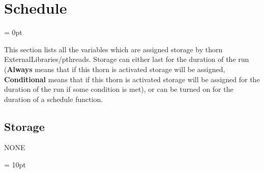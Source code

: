
\section{Schedule} 


\parskip = 0pt


\noindent This section lists all the variables which are assigned storage by thorn ExternalLibraries/pthreads.  Storage can either last for the duration of the run ({\bf Always} means that if this thorn is activated storage will be assigned, {\bf Conditional} means that if this thorn is activated storage will be assigned for the duration of the run if some condition is met), or can be turned on for the duration of a schedule function.


\subsection*{Storage}NONE

\vspace{5mm}\parskip = 10pt 
